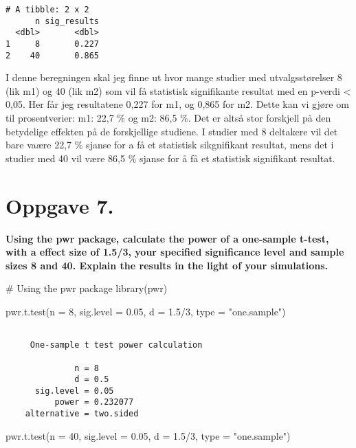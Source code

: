 \documentclass[
  letterpaper,
  DIV=11,
  numbers=noendperiod]{scrreprt}
\newenvironment{Shaded}{\begin{snugshade}}{\end{snugshade}}
\newcommand{\AttributeTok}[1]{\textcolor[rgb]{0.40,0.45,0.13}{#1}}
\newcommand{\CommentTok}[1]{\textcolor[rgb]{0.37,0.37,0.37}{#1}}
\newcommand{\DecValTok}[1]{\textcolor[rgb]{0.68,0.00,0.00}{#1}}
\newcommand{\FloatTok}[1]{\textcolor[rgb]{0.68,0.00,0.00}{#1}}
\newcommand{\FunctionTok}[1]{\textcolor[rgb]{0.28,0.35,0.67}{#1}}
\newcommand{\NormalTok}[1]{\textcolor[rgb]{0.00,0.23,0.31}{#1}}
\newcommand{\SpecialCharTok}[1]{\textcolor[rgb]{0.37,0.37,0.37}{#1}}
\newcommand{\StringTok}[1]{\textcolor[rgb]{0.13,0.47,0.30}{#1}}
\begin{document}
\begin{verbatim}
# A tibble: 2 x 2
      n sig_results
  <dbl>       <dbl>
1     8       0.227
2    40       0.865
\end{verbatim}

I denne beregningen skal jeg finne ut hvor mange studier med
utvalgsstørelser 8 (lik m1) og 40 (lik m2) som vil få statistisk
signifikante resultat med en p-verdi \textless{} 0,05. Her får jeg
resultatene 0,227 for m1, og 0,865 for m2. Dette kan vi gjøre om til
prosentverier: m1: 22,7 \% og m2: 86,5 \%. Det er altså stor forskjell
på den betydelige effekten på de forskjellige studiene. I studier med 8
deltakere vil det bare vaære 22,7 \% sjanse for a få et statistisk
sikgnifikant resultat, mens det i studier med 40 vil være 86,5 \% sjanse
for å få et statistisk signifikant resultat.

\section{Oppgave 7.}\label{oppgave-7.}

\textbf{Using the pwr package, calculate the power of a one-sample
t-test, with a effect size of 1.5/3, your specified significance level
and sample sizes 8 and 40. Explain the results in the light of your
simulations.}

\begin{Shaded}
\begin{Highlighting}[]
\CommentTok{\# Using the pwr package}
\FunctionTok{library}\NormalTok{(pwr)}

\FunctionTok{pwr.t.test}\NormalTok{(}\AttributeTok{n =} \DecValTok{8}\NormalTok{, }\AttributeTok{sig.level =} \FloatTok{0.05}\NormalTok{, }\AttributeTok{d =} \FloatTok{1.5}\SpecialCharTok{/}\DecValTok{3}\NormalTok{, }\AttributeTok{type =} \StringTok{"one.sample"}\NormalTok{)}
\end{Highlighting}
\end{Shaded}

\begin{verbatim}

     One-sample t test power calculation 

              n = 8
              d = 0.5
      sig.level = 0.05
          power = 0.232077
    alternative = two.sided
\end{verbatim}

\begin{Shaded}
\begin{Highlighting}[]
\FunctionTok{pwr.t.test}\NormalTok{(}\AttributeTok{n =} \DecValTok{40}\NormalTok{, }\AttributeTok{sig.level =} \FloatTok{0.05}\NormalTok{, }\AttributeTok{d =} \FloatTok{1.5}\SpecialCharTok{/}\DecValTok{3}\NormalTok{, }\AttributeTok{type =} \StringTok{"one.sample"}\NormalTok{)}
\end{Highlighting}
\end{Shaded}
\end{document}
